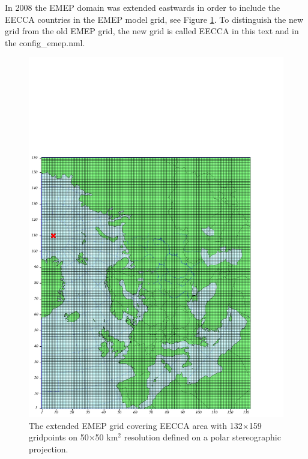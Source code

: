 In 2008 the EMEP domain was extended eastwards in order to include the 
EECCA countries in the EMEP model grid, see Figure \ref{fig:EECCA}. To distinguish the new grid from the old EMEP 
grid, the new grid is called EECCA in this text and in the config\_emep.nml.

\begin{figure}[ht]
 \centering
\includegraphics[scale=1.1]{EECCA}
\caption{The extended EMEP grid covering EECCA area with
132$\times$159 gridpoints on 50$\times$50 km$^2$ resolution defined on
a polar stereographic
projection.}\label{fig:EECCA}
\end{figure}


